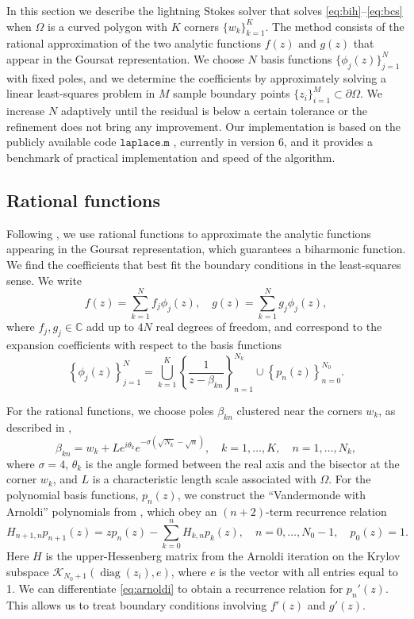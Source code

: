 \documentclass{article}
\DeclareMathOperator{\diag}{diag}
\begin{document}
In this section we describe the lightning Stokes solver that solves
\eqref{eq:bih}--\eqref{eq:bcs} when $\Omega$ is a curved polygon with $K$
corners $\{w_k\}_{k=1}^K$. The method consists of the rational approximation of
the two analytic functions $f(z)$ and $g(z)$ that appear in the Goursat
representation. We choose $N$ basis functions $\{\phi_j(z)\}_{j=1}^N$ with
fixed poles, and we determine the coefficients by approximately solving a
linear least-squares problem in $M$ sample boundary points $\{z_i\}_{i=1}^M
\subset \partial\Omega$. We increase $N$ adaptively until the residual is below
a certain tolerance or the refinement does not bring any improvement. Our
implementation is based on the publicly available code $\texttt{laplace.m}$
\cite{tref20}, currently in version 6, and it provides a benchmark of practical
implementation and speed of the algorithm.


\subsection{Rational functions}
Following \cite{gopal19}, we use rational functions to approximate the analytic
functions appearing in the Goursat representation, which guarantees a
biharmonic function. We find the coefficients that best fit the boundary
conditions in the least-squares sense. We write
\begin{equation}
f(z) = \sum_{k=1}^N f_j \phi_j(z), \quad g(z) = \sum_{k=1}^N g_j \phi_j(z),
\end{equation}
where $f_j, g_j\in \mathbb{C}$ add up to $4N$ real degrees of freedom, and
correspond to the expansion coefficients with respect to the basis functions
\begin{equation}
\left\{\phi_j(z)\right\}_{j=1}^{N} = 
   \bigcup_{k=1}^K\left\{\frac{1}{z-\beta_{kn}}\right\}_{n=1}^{N_k} 
   \cup \left\{p_n(z)\right\}_{n=0}^{N_0}.
\end{equation}

For the rational functions, we choose poles $\beta_{kn}$ clustered near the
corners $w_k$, as described in \cite{gopal19},
\begin{equation} \label{eq:poles}
\beta_{kn} = w_k + Le^{i\theta_k} e^{-\sigma (\sqrt{N_k}-\sqrt{n})}, 
   \quad k=1,\ldots,K,\quad n=1,\ldots,N_k,
\end{equation}
where $\sigma=4$, $\theta_k$ is the angle formed between the real axis and the
bisector at the corner $w_k$, and $L$ is a characteristic length scale
associated with $\Omega$. For the polynomial basis functions, $p_n(z)$, we
construct the ``Vandermonde with Arnoldi'' polynomials from \cite{brubeck19},
which obey an $(n+2)$-term recurrence relation
\begin{equation} \label{eq:arnoldi}
H_{n+1,n} p_{n+1}(z) = z p_n(z) - \sum_{k=0}^n H_{k,n} p_k(z),
   \quad n=0,\ldots,N_0-1, \quad p_0(z)=1.
\end{equation}
Here $H$ is the upper-Hessenberg matrix from the Arnoldi iteration on the
Krylov subspace $\mathcal{K}_{N_0+1}(\diag(z_i), e)$, where $e$ is the vector
with all entries equal to 1. We can differentiate \eqref{eq:arnoldi} to obtain
a recurrence relation for $p_n'(z)$. This allows us to treat boundary
conditions involving $f'(z)$ and $g'(z)$.
\end{document}
